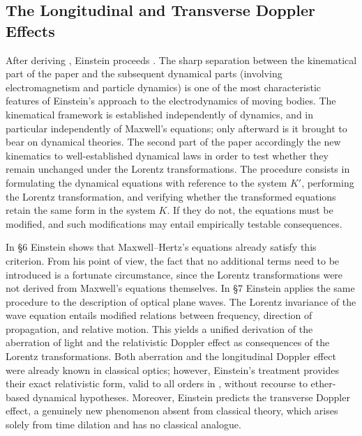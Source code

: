 \documentclass[submitted,12pt]{article} %
\begin{document}
\subsection{The Longitudinal and Transverse Doppler Effects}
%
After deriving , Einstein proceeds  \citep[907]{Einstein1905}. The sharp separation between the kinematical part of the paper and the subsequent dynamical parts (involving electromagnetism and particle dynamics) is one of the most characteristic features of Einstein’s approach to the electrodynamics of moving bodies. The kinematical framework is established independently of dynamics, and in particular independently of Maxwell’s equations; only afterward is it brought to bear on dynamical theories. The second part of the paper accordingly  the new kinematics to well-established dynamical laws in order to test whether they remain unchanged under the Lorentz transformations. The procedure consists in formulating the dynamical equations with reference to the  system $K'$, performing the Lorentz transformation, and verifying whether the transformed equations retain the same form in the  system $K$. If they do not, the equations must be modified, and such modifications may entail empirically testable consequences.



In \S6 Einstein shows that Maxwell–Hertz’s equations already satisfy this criterion. From his point of view, the fact that no additional terms need to be introduced is a fortunate circumstance, since the Lorentz transformations were not derived from Maxwell’s equations themselves. In \S7 Einstein applies the same procedure to the description of optical plane waves. The Lorentz invariance of the wave equation entails modified relations between frequency, direction of propagation, and relative motion. This yields a unified derivation of the aberration of light and the relativistic Doppler effect as consequences of the Lorentz transformations. Both aberration and the longitudinal Doppler effect were already known in classical optics; however, Einstein’s treatment provides their exact relativistic form, valid to all orders in \betafactorh, without recourse to ether-based dynamical hypotheses. Moreover, Einstein predicts the transverse Doppler effect, a genuinely new phenomenon absent from classical theory, which arises solely from time dilation and has no classical analogue.
\end{document}
